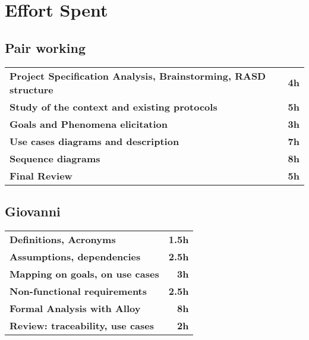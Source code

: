 \section{Effort Spent}
\subsection*{Pair working}
\begin{table}[H]
    \begin{tabular}{lr}
        \toprule
        \textbf{Project Specification Analysis, Brainstorming, RASD structure} & \textbf{4h} \\
        \textbf{Study of the context and existing protocols}                   & \textbf{5h} \\
        \textbf{Goals and Phenomena elicitation}                               & \textbf{3h} \\
        \textbf{Use cases diagrams and description}                            & \textbf{7h} \\
        \textbf{Sequence diagrams}                                             & \textbf{8h} \\
        \textbf{Final Review}                                                  & \textbf{5h} \\
        \bottomrule
    \end{tabular}
\end{table}

\subsection*{Giovanni}
\begin{table}[H]
    \begin{tabular}{lr}
        \toprule
        \textbf{Definitions, Acronyms}           & \textbf{1.5h} \\
        \textbf{Assumptions, dependencies}       & \textbf{2.5h} \\
        \textbf{Mapping on goals, on use cases}  & \textbf{3h}   \\
        \textbf{Non-functional requirements}     & \textbf{2.5h} \\
        \textbf{Formal Analysis with Alloy}      & \textbf{8h}   \\
        \textbf{Review: traceability, use cases} & \textbf{2h}   \\
        \bottomrule
    \end{tabular}
\end{table}

